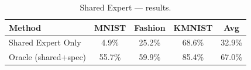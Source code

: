 \begin{table}[h]
\centering
\caption{Shared Expert --- results.}
\begin{tabular}{l c c c c}
\hline
\textbf{Method} & \textbf{MNIST} & \textbf{Fashion} & \textbf{KMNIST} & \textbf{Avg} \\
\hline
Shared Expert Only & 4.9\% & 25.2\% & 68.6\% & 32.9\% \\
Oracle (shared+spec) & 55.7\% & 59.9\% & 85.4\% & 67.0\% \\
\hline
\end{tabular}
\end{table}
